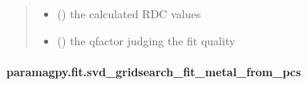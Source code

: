 \documentclass[a4paper,10pt,english]{sphinxmanual}
\begin{document}
\begin{fulllineitems}
\begin{quote}
\begin{description}
\begin{itemize}
\item {} 
 () \textendash{} the calculated RDC values

\item {} 
 () \textendash{} the qfactor judging the fit quality

\end{itemize}


\end{description}\end{quote}

\end{fulllineitems}



\paragraph{paramagpy.fit.svd\_gridsearch\_fit\_metal\_from\_pcs}
\label{\detokenize{reference/generated/paramagpy.fit.svd_gridsearch_fit_metal_from_pcs:paramagpy-fit-svd-gridsearch-fit-metal-from-pcs}}\label{\detokenize{reference/generated/paramagpy.fit.svd_gridsearch_fit_metal_from_pcs::doc}}
\end{document}
